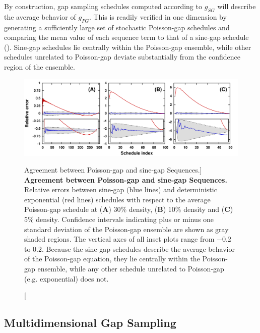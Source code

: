 \begin{doublespace}
By construction, gap sampling schedules computed according to $g_{SG}$ will
describe the average behavior of $g_{PG}$. This is readily verified in one
dimension by generating a sufficiently large set of stochastic Poisson-gap
schedules and comparing the mean value of each sequence term to that of a
sine-gap schedule (). Sine-gap schedules
lie centrally within the Poisson-gap ensemble, while other schedules
unrelated to Poisson-gap deviate substantially from the confidence
region of the ensemble.
\end{doublespace}

\begin{figure}[ht!]
\includegraphics[width=6in]{figs/dgs/01-avepg.png}
\caption
      [Agreement between Poisson-gap and sine-gap Sequences.]{
  {\bf Agreement between Poisson-gap and sine-gap Sequences.}
  \\
  Relative errors between sine-gap (blue lines) and deterministic exponential
  (red lines) schedules with respect to the average Poisson-gap schedule at
  ({\bf A}) 30\% density, ({\bf B}) 10\% density and ({\bf C}) 5\% density.
  Confidence intervals indicating plus or minus one standard deviation of the
  Poisson-gap ensemble are shown as gray shaded regions. The vertical axes of
  all inset plots range from $-0.2$ to $0.2$. Because the sine-gap schedules
  describe the average behavior of the Poisson-gap equation, they lie
  centrally within the Poisson-gap ensemble, while any other schedule
  unrelated to Poisson-gap (e.g. exponential) does not.
}
\label{figure.2.1}
\end{figure}

\subsection{Multidimensional Gap Sampling}

